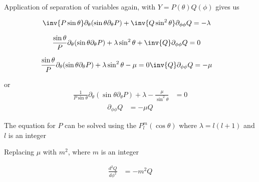 Application of separation of variables again, with \(Y = P(\theta) Q(\phi)\) gives us

\begin{equation}\label{eqn:lecture5BigReviewAngularMomentum:5120}
\begin{aligned}
\inv{P \sin\theta} \partial_\theta (\sin\theta \partial_\theta P) + \inv{Q \sin^2\theta} \partial_{\phi\phi} Q &= -\lambda
\end{aligned}
\end{equation}

\begin{equation}\label{eqn:lecture5BigReviewAngularMomentum:5140}
\begin{aligned}
\frac{\sin\theta}{P } \partial_\theta (\sin\theta \partial_\theta P)
+\lambda  \sin^2\theta
+ \inv{Q } \partial_{\phi\phi} Q &= 0
\end{aligned}
\end{equation}

\begin{equation}\label{eqn:lecture5BigReviewAngularMomentum:5160}
\begin{aligned}
\frac{\sin\theta}{P } \partial_\theta (\sin\theta \partial_\theta P) + \lambda \sin^2\theta - \mu = 0
\inv{Q } \partial_{\phi\phi} Q &= -\mu
\end{aligned}
\end{equation}

or
\begin{equation}\label{eqn:PHY356F:1000}
\begin{aligned}
\frac{1}{P \sin\theta} \partial_\theta (\sin\theta \partial_\theta P) +\lambda -\frac{\mu}{\sin^2\theta} &= 0
\end{aligned}
\end{equation}
\begin{equation}\label{eqn:PHY356F:2000}
\begin{aligned}
\partial_{\phi\phi} Q &= -\mu Q
\end{aligned}
\end{equation}

The equation for \(P\) can be solved using the  \(P_l^m(\cos\theta)\) where \(\lambda = l(l+1)\) and \(l\) is an integer

Replacing \(\mu\) with \(m^2\), where \(m\) is an integer

\begin{equation}\label{eqn:lecture5BigReviewAngularMomentum:5180}
\begin{aligned}
\frac{d^2 Q}{d\phi^2} &= -m^2 Q
\end{aligned}
\end{equation}

